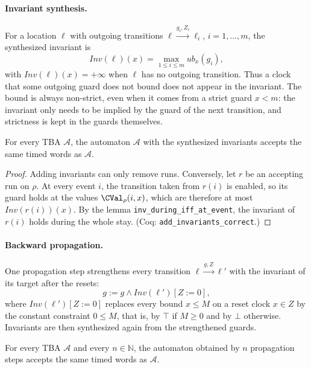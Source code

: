 \paragraph{Invariant synthesis.}
For a location $\ell$ with outgoing transitions
$\ell\xrightarrow{g_i,Z_i}\ell_i$, $i=1,\dots,m$, the synthesized invariant is
\[
  \mathit{Inv}(\ell)(x)=\max_{1\le i\le m}\mathit{ub}_x(g_i),
\]
with $\mathit{Inv}(\ell)(x)=+\infty$ when $\ell$ has no outgoing transition.
Thus a clock that some outgoing guard does not bound does not appear in the
invariant.  The bound is always non-strict, even when it comes from a strict
guard $x<m$: the invariant only needs to be implied by the guard of the next
transition, and strictness is kept in the guards themselves.

\begin{theorem}
\label{thm:inv-synthesis}
For every TBA $\mathcal A$, the automaton $\mathcal A$ with the synthesized
invariants accepts the same timed words as $\mathcal A$.
\end{theorem}

\begin{proof}
Adding invariants can only remove runs.  Conversely, let $r$ be an accepting
run on $\rho$.  At every event $i$, the transition taken from $r(i)$ is enabled,
so its guard holds at the values $\CVal_\rho(i,x)$, which are therefore at most
$\mathit{Inv}(r(i))(x)$.  By the lemma \texttt{inv\_\allowbreak{}during\_\allowbreak{}iff\_\allowbreak{}at\_\allowbreak{}event}, the invariant of $r(i)$ holds during
the whole stay.  (Coq: \texttt{add\_\allowbreak{}invariants\_\allowbreak{}correct}.)
\end{proof}

\paragraph{Backward propagation.}
One propagation step strengthens every transition
$\ell\xrightarrow{g,Z}\ell'$ with the invariant of its target after the
resets:
\[
  g := g\wedge\mathit{Inv}(\ell')[Z:=0],
\]
where $\mathit{Inv}(\ell')[Z:=0]$ replaces every bound $x\le M$ on a reset clock
$x\in Z$ by the constant constraint $0\le M$, that is, by $\top$ if $M\ge0$ and
by $\bot$ otherwise.  Invariants are then synthesized again from the
strengthened guards.

\begin{theorem}
\label{thm:propagation}
For every TBA $\mathcal A$ and every $n\in\mathbb N$, the automaton obtained by
$n$ propagation steps accepts the same timed words as $\mathcal A$.
\end{theorem}

